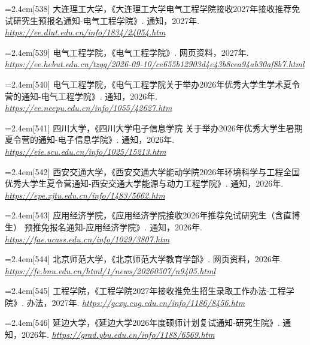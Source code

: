 {\par\noindent\hangindent=2.4em\label{src:S0139}{\color{cAccent}[538]} 大连理工大学，《大连理工大学电气工程学院接收2027年接收推荐免试研究生预报名通知-电气工程学院》. 通知，2027年. \textit{\url{https://ee.dlut.edu.cn/info/1834/24054.htm}}\par
\par\noindent\hangindent=2.4em\label{src:S0140}{\color{cAccent}[539]} 电气工程学院，《电气工程学院》. 网页资料，2027年. \textit{\url{https://ee.hebut.edu.cn/tzgg/2026-09-10/ce655b12903d4e43b8cea94ab30af8b7.html}}\par
\par\noindent\hangindent=2.4em\label{src:S0141}{\color{cAccent}[540]} 电气工程学院，《电气工程学院关于举办2026年优秀大学生学术夏令营的通知-电气工程学院》. 通知，2026年. \textit{\url{https://ee.neepu.edu.cn/info/1055/42627.htm}}\par
\par\noindent\hangindent=2.4em\label{src:S0142}{\color{cAccent}[541]} 四川大学，《四川大学电子信息学院 关于举办2026年优秀大学生暑期夏令营的通知-电子信息学院》. 通知，2026年. \textit{\url{https://eie.scu.edu.cn/info/1025/15213.htm}}\par
\par\noindent\hangindent=2.4em\label{src:S0146}{\color{cAccent}[542]} 西安交通大学，《西安交通大学能动学院2026年环境科学与工程全国优秀大学生夏令营通知-西安交通大学能源与动力工程学院》. 通知，2026年. \textit{\url{https://epe.xjtu.edu.cn/info/1483/5662.htm}}\par
\par\noindent\hangindent=2.4em\label{src:S0148}{\color{cAccent}[543]} 应用经济学院，《应用经济学院接收2026年推荐免试研究生（含直博生） 预推免报名通知-应用经济学院》. 通知，2026年. \textit{\url{https://fae.ucass.edu.cn/info/1029/3807.htm}}\par
\par\noindent\hangindent=2.4em\label{src:S0150}{\color{cAccent}[544]} 北京师范大学，《北京师范大学教育学部》. 网页资料，2026年. \textit{\url{https://fe.bnu.edu.cn/html/1/news/20260507/n9405.html}}\par
\par\noindent\hangindent=2.4em\label{src:S0155}{\color{cAccent}[545]} 工程学院，《工程学院2027年接收推免生招生录取工作办法-工程学院》. 办法，2027年. \textit{\url{https://gcxy.cug.edu.cn/info/1186/8456.htm}}\par
\par\noindent\hangindent=2.4em\label{src:S0159}{\color{cAccent}[546]} 延边大学，《延边大学2026年度硕师计划复试通知-研究生院》. 通知，2026年. \textit{\url{https://grad.ybu.edu.cn/info/1188/6569.htm}}\par
}
